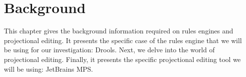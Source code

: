 \chapter{Background}
\label{chapter:Background}

This chapter gives the background information required on rules engines and projectional editing.
It presents the specific case of the rules engine that we will be using for our investigation: Drools.
Next, we delve into the world of projectional editing.
Finally, it presents the specific projectional editing tool we will be using: JetBrains MPS.




